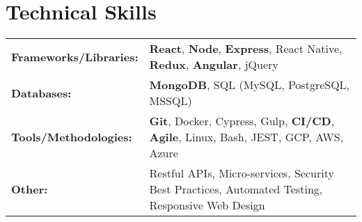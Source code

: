 \documentclass[a4paper,10pt]{article}  %
\begin{document}
\section{Technical Skills}
\begin{tabularx}{\linewidth}{@{}l X@{}}

\textbf{Frameworks/Libraries:} & \textbf{React}, \textbf{Node}, \textbf{Express}, React Native, \textbf{Redux}, \textbf{Angular}, jQuery \\
\textbf{Databases:} & \textbf{MongoDB}, SQL (MySQL, PostgreSQL, MSSQL) \\
\textbf{Tools/Methodologies:} & \textbf{Git}, Docker, Cypress, Gulp, \textbf{CI/CD}, \textbf{Agile}, Linux, Bash, JEST, GCP, AWS, Azure \\ 
\textbf{Other:} & Restful APIs, Micro-services, Security Best Practices, Automated Testing, Responsive Web Design \\ 
\end{tabularx}

\vfill
\end{document}
